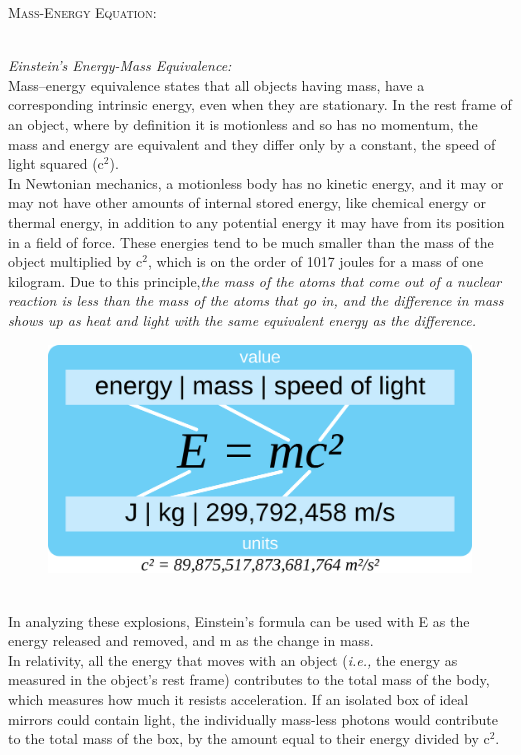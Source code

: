 \documentclass[12pt]{article}
\begin{document}
\begin{center}
\textsc{\LARGE Mass-Energy Equation:} \\ [1.0 cm]
\huge \huge \bfseries {}\\[1.5 cm]
\end{center} 
\large{\textit{Einstein's Energy-Mass Equivalence:}}\\ [0.5 cm]
Mass–energy equivalence states that all objects having mass, have a corresponding intrinsic energy, even when they are stationary. In the rest frame of an object, where by definition it is motionless and so has no momentum, the mass and energy are equivalent and they differ only by a constant, the speed of light squared (c$^2$).\\ [0.3 cm]
In Newtonian mechanics, a motionless body has no kinetic energy, and it may or may not have other amounts of internal stored energy, like chemical energy or thermal energy, in addition to any potential energy it may have from its position in a field of force. These energies tend to be much smaller than the mass of the object multiplied by c$^2$, which is on the order of 1017 joules for a mass of one kilogram. Due to this principle,\textit{the mass of the atoms that come out of a nuclear reaction is less than the mass of the atoms that go in, and the difference in mass shows up as heat and light with the same equivalent energy as the difference.}\\ [0.3 cm]
\begin{figure} [h!]
    \centering
    \includegraphics[scale = 0.20]{10.png}
\end{figure} \\[0.3 cm]
In analyzing these explosions, Einstein's formula can be used with E as the
energy released and removed, and m as the change in mass.\\[0.3 cm]
In relativity, all the energy that moves with an object (\textit{i.e.,} the energy as measured in the object's rest frame) contributes to the total mass of the body, which measures how much it resists acceleration. If an isolated box of ideal mirrors could contain light, the individually mass-less photons would contribute to the total mass of the box, by the amount equal to their energy divided by c$^2$.\\[0.3 cm]
\end{document}
